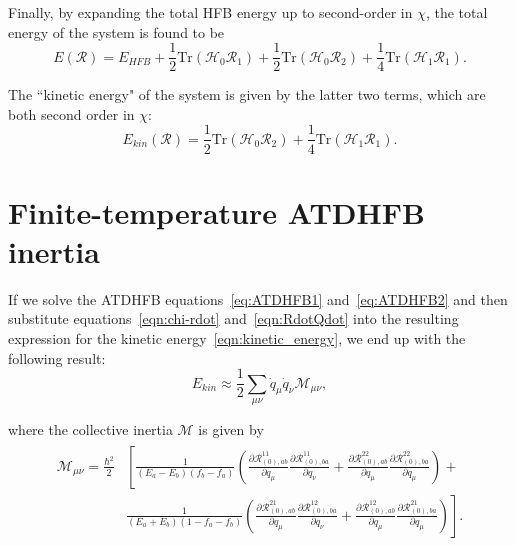 Finally, by expanding the total HFB energy up to second-order in $\chi$, the total energy of the system is found to be
\begin{equation}
E(\mathcal{R}) = E_{HFB} + \frac{1}{2}\mathrm{Tr}\left(\mathcal{H}_0\mathcal{R}_1\right) + \frac{1}{2}\mathrm{Tr}\left(\mathcal{H}_0\mathcal{R}_2\right) + \frac{1}{4}\mathrm{Tr}\left(\mathcal{H}_1\mathcal{R}_1\right).
\end{equation}

\noindent The ``kinetic energy" of the system is given by the latter two terms, which are both second order in $\chi$:
\begin{equation}\label{eqn:kinetic_energy}
E_{kin}(\mathcal{R}) = \frac{1}{2}\mathrm{Tr}\left(\mathcal{H}_0\mathcal{R}_2\right) + \frac{1}{4}\mathrm{Tr}\left(\mathcal{H}_1\mathcal{R}_1\right).
\end{equation}


\section{Finite-temperature ATDHFB inertia}
If we solve the ATDHFB equations~\eqref{eq:ATDHFB1} and~\eqref{eq:ATDHFB2} and then substitute equations~\eqref{eqn:chi-rdot} and~\eqref{eqn:RdotQdot} into the resulting expression for the kinetic energy~\eqref{eqn:kinetic_energy}, we end up with the following result:
\begin{equation}
	E_{kin} \approx \frac{1}{2}\sum_{\mu\nu}\dot{q}_\mu\dot{q}_\nu\mathcal{M}_{\mu\nu},
\end{equation}

\noindent where the collective inertia $\mathcal{M}$ is given by
\begin{align}\label{crankedFiniteTempInertia}
	\begin{aligned}
	\mathcal{M}_{\mu\nu} =  \frac{\hbar^2}{2}&\left[\frac{1}{(E_a-E_b)(f_b-f_a)}\left(\frac{\partial\mathcal{R}^{11}_{(0),ab}}{\partial q_\mu}\frac{\partial\mathcal{R}^{11}_{(0),ba}}{\partial q_\nu}+\frac{\partial\mathcal{R}^{22}_{(0),ab}}{\partial q_\mu}\frac{\partial\mathcal{R}^{22}_{(0),ba}}{\partial q_\mu}\right)\right.+ \\
	&\left.\frac{1}{(E_a+E_b)(1-f_a-f_b)}\left(\frac{\partial\mathcal{R}^{21}_{(0),ab}}{\partial q_\mu}\frac{\partial\mathcal{R}^{12}_{(0),ba}}{\partial q_\nu}+\frac{\partial\mathcal{R}^{12}_{(0),ab}}{\partial q_\mu}\frac{\partial\mathcal{R}^{21}_{(0),ba}}{\partial q_\mu}\right)\right].
	\end{aligned}
\end{align}

